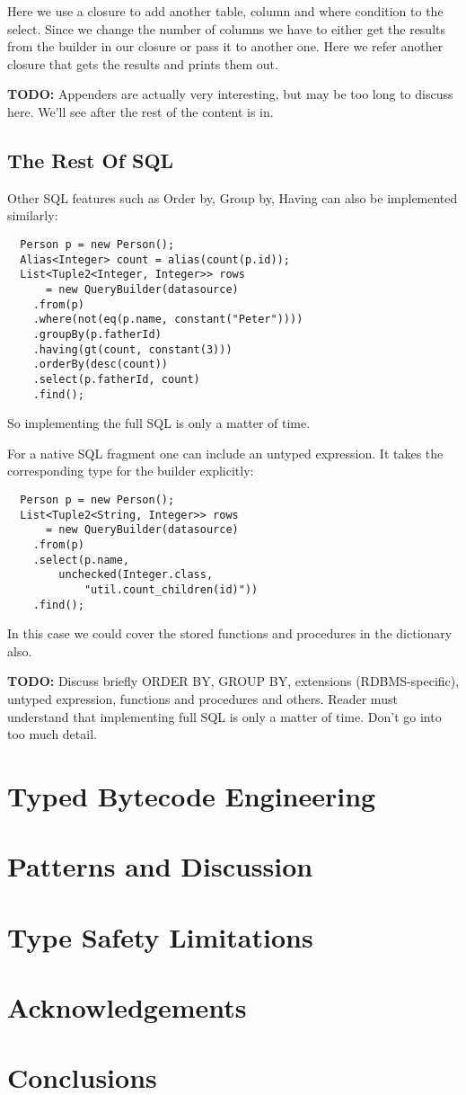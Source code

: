 \documentclass{sig-alternate}
\begin{document}
Here we use a closure to add another table, column and where condition to the select. Since we change the number of columns we have to either get the results from the builder in our closure or pass it to another one. Here we refer another closure that gets the results and prints them out.

\textbf{TODO:} Appenders are actually very interesting, but may be too long to discuss here. We'll see after the rest of the content is in.

\subsection{The Rest Of SQL}

Other SQL features such as Order by, Group by, Having can also be implemented similarly:

\begin{verbatim}
  Person p = new Person();
  Alias<Integer> count = alias(count(p.id));
  List<Tuple2<Integer, Integer>> rows
      = new QueryBuilder(datasource)
    .from(p)
    .where(not(eq(p.name, constant("Peter"))))
    .groupBy(p.fatherId)
    .having(gt(count, constant(3)))
    .orderBy(desc(count))
    .select(p.fatherId, count)
    .find();
\end{verbatim}

So implementing the full SQL is only a matter of time.

For a native SQL fragment one can include an untyped expression.
It takes the corresponding type for the builder explicitly:

\begin{verbatim}
  Person p = new Person();
  List<Tuple2<String, Integer>> rows
      = new QueryBuilder(datasource)
    .from(p)
    .select(p.name,
        unchecked(Integer.class,
            "util.count_children(id)"))
    .find();
\end{verbatim}

In this case we could cover the stored functions and procedures in the dictionary also.

\textbf{TODO:} Discuss briefly ORDER BY, GROUP BY, extensions (RDBMS-specific), untyped expression, functions and procedures and others. Reader must understand that implementing full SQL is only a matter of time. Don't go into too much detail.

\section{Typed Bytecode Engineering}

\section{Patterns and Discussion}

\section{Type Safety Limitations}

\section{Acknowledgements}

\section{Conclusions}



\end{document}
